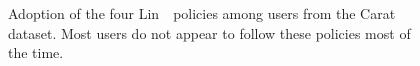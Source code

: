 \documentclass[thesis.tex]{subfiles}
\begin{document}
\begin{figure}
  \centering
  \\
  \\
  \vspace{2em}
  \caption[Adoption of Lin~\etal~policies.]{Adoption of the four Lin~\etal~policies among users from the Carat dataset.  Most users do not appear to follow these policies most of the time.}
  \label{fig:lin_uptake_graphs}
\end{figure}
\end{document}
